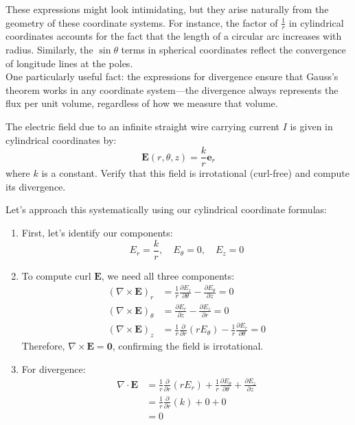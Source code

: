 \noindent These expressions might look intimidating, but they arise naturally from the geometry of these coordinate systems. For instance, the factor of $\frac{1}{r}$ in cylindrical coordinates accounts for the fact that the length of a circular arc increases with radius. Similarly, the $\sin\theta$ terms in spherical coordinates reflect the convergence of longitude lines at the poles. \\

\noindent One particularly useful fact: the expressions for divergence ensure that Gauss's theorem works in any coordinate system—the divergence always represents the flux per unit volume, regardless of how we measure that volume.

\exampleline
\begin{example}
The electric field due to an infinite straight wire carrying current $I$ is given in cylindrical coordinates by:
\[
\mathbf{E}(r,\theta,z) = \frac{k}{r}\mathbf{e}_r
\]
where $k$ is a constant. Verify that this field is irrotational (curl-free) and compute its divergence.

\begin{solution}
Let's approach this systematically using our cylindrical coordinate formulas:

\begin{enumerate}
\item First, let's identify our components:
\[
E_r = \frac{k}{r}, \quad E_\theta = 0, \quad E_z = 0
\]

\item To compute curl $\mathbf{E}$, we need all three components:
\begin{align*}
(\nabla \times \mathbf{E})_r &= \frac{1}{r}\frac{\partial E_z}{\partial \theta} - \frac{\partial E_\theta}{\partial z} = 0 \\[1em]
(\nabla \times \mathbf{E})_\theta &= \frac{\partial E_r}{\partial z} - \frac{\partial E_z}{\partial r} = 0 \\[1em]
(\nabla \times \mathbf{E})_z &= \frac{1}{r}\frac{\partial}{\partial r}(rE_\theta) - \frac{1}{r}\frac{\partial E_r}{\partial \theta} = 0
\end{align*}
Therefore, $\nabla \times \mathbf{E} = \mathbf{0}$, confirming the field is irrotational.

\item For divergence:
\begin{align*}
\nabla \cdot \mathbf{E} &= \frac{1}{r}\frac{\partial}{\partial r}(rE_r) + \frac{1}{r}\frac{\partial E_\theta}{\partial \theta} + \frac{\partial E_z}{\partial z} \\[1em]
&= \frac{1}{r}\frac{\partial}{\partial r}\left(k\right) + 0 + 0 \\[1em]
&= 0
\end{align*}
\end{enumerate}


\end{solution}
\end{example}
